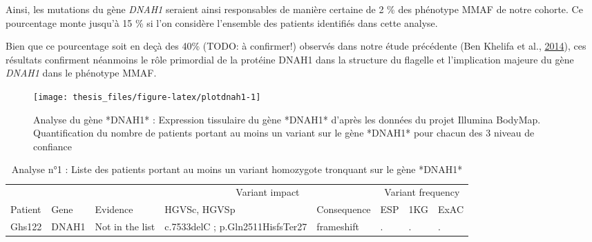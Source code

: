 \documentclass[12pt,twoside]{reedthesis}
\theoremstyle{definition}
\theoremstyle{definition}
\theoremstyle{remark}
\begin{document}
  Ainsi, les mutations du gène \emph{DNAH1} seraient ainsi responsables de
  manière certaine de 2 \% des phénotype MMAF de notre cohorte. Ce
  pourcentage monte jusqu'à 15 \% si l'on considère l'ensemble des
  patients identifiés dans cette analyse.
  
  Bien que ce pourcentage soit en deçà des 40\% (TODO: à confirmer!)
  observés dans notre étude précédente (Ben Khelifa et al.,
  \protect\hyperlink{ref-BenKhelifa2014}{2014}), ces résultats confirment
  néanmoins le rôle primordial de la protéine DNAH1 dans la structure du
  flagelle et l'implication majeure du gène \emph{DNAH1} dans le phénotype
  MMAF.
  
  \newpage
  
  \begin{figure}
  
  {\centering \texttt{[image: thesis\_files/figure-latex/plotdnah1-1]} 
  
  }
  
  \caption[Analyse du gène *DNAH1*]{Analyse du gène *DNAH1* : Expression tissulaire du gène *DNAH1* d'après les données du projet Illumina BodyMap. Quantification du nombre de patients portant au moins un variant sur le gène *DNAH1* pour chacun des 3 niveau de confiance}\label{fig:plotdnah1}
  \end{figure}
  
  \newpage
  
  \begin{landscape}
  \begin{longtable}[t]{llllllll}
  \caption{\label{tab:tabdnah1high}Analyse n°1 : Liste des patients portant au moins un variant homozygote tronquant sur le gène *DNAH1*}\\
  \toprule
  \multicolumn{1}{c}{ } & \multicolumn{1}{c}{ } & \multicolumn{1}{c}{ } & \multicolumn{2}{c}{Variant impact} & \multicolumn{3}{c}{Variant frequency} \\
  \cmidrule(l{2pt}r{2pt}){4-5} \cmidrule(l{2pt}r{2pt}){6-8}
  Patient & Gene & Evidence & HGVSc, HGVSp & Consequence & ESP & 1KG & ExAC\\
  \midrule
  Ghs122 & DNAH1 & Not in the list & c.7533delC ; p.Gln2511HisfsTer27 & frameshift & . & . & .\\
  \bottomrule
  \end{longtable}
  \end{landscape}
  
\end{document}

